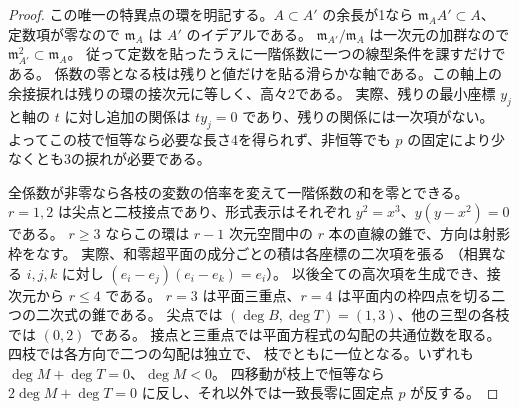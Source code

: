\begin{proof}
この唯一の特異点の環を明記する。$A\subset A'$ の余長が1なら $\mathfrak m_A A'\subset A$、
定数項が零なので $\mathfrak m_A$ は $A'$ のイデアルである。
$\mathfrak m_{A'}/\mathfrak m_A$ は一次元の加群なので $\mathfrak m_{A'}^2\subset\mathfrak m_A$。
従って定数を貼ったうえに一階係数に一つの線型条件を課すだけである。
係数の零となる枝は残りと値だけを貼る滑らかな軸である。この軸上の余接捩れは残りの環の接次元に等しく、高々2である。
実際、残りの最小座標 $y_j$ と軸の $t$ に対し追加の関係は $t y_j=0$ であり、残りの関係には一次項がない。
よってこの枝で恒等なら必要な長さ4を得られず、非恒等でも $p$ の固定により少なくとも3の捩れが必要である。

全係数が非零なら各枝の変数の倍率を変えて一階係数の和を零とできる。
$r=1,2$ は尖点と二枝接点であり、形式表示はそれぞれ $y^2=x^3$、$y(y-x^2)=0$ である。
$r\ge3$ ならこの環は $r-1$ 次元空間中の $r$ 本の直線の錐で、方向は射影枠をなす。
実際、和零超平面の成分ごとの積は各座標の二次項を張る
（相異なる $i,j,k$ に対し $(e_i-e_j)(e_i-e_k)=e_i$）。
以後全ての高次項を生成でき、接次元から $r\le4$ である。
$r=3$ は平面三重点、$r=4$ は平面内の枠四点を切る二つの二次式の錐である。
尖点では $(\deg B,\deg T)=(1,3)$、他の三型の各枝では $(0,2)$ である。
接点と三重点では平面方程式の勾配の共通位数を取る。四枝では各方向で二つの勾配は独立で、
枝でともに一位となる。いずれも $\deg M+\deg T=0$、$\deg M<0$。
四移動が枝上で恒等なら $2\deg M+\deg T=0$ に反し、それ以外では一致長零に固定点 $p$ が反する。
\end{proof}

